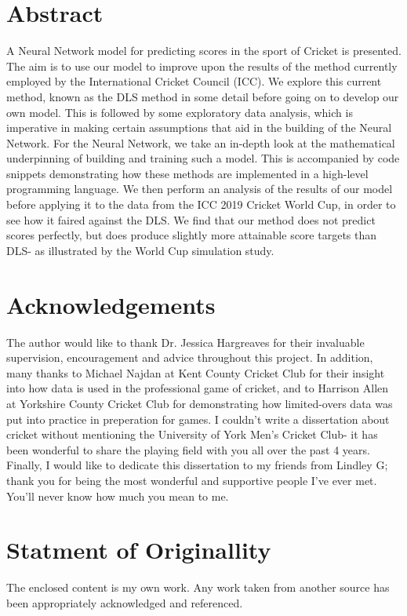 \documentclass[11pt]{report}
\begin{document}


\section*{Abstract}
A Neural Network model for predicting scores in the sport of Cricket is presented. The aim is to use our model to improve upon the results of the method currently employed by 
the International Cricket Council (ICC). We explore this current method, known as the DLS method \cite{stern} in 
some detail before going on to develop our own model. This is followed by some exploratory data analysis, which is imperative in making certain assumptions that aid 
in the building of the Neural Network. For the Neural Network, we take an in-depth look at the mathematical underpinning of building and training such a model. This 
is accompanied by code snippets demonstrating how these methods are implemented in a high-level programming language. We then perform an analysis of the results 
of our model before applying it to the data from the ICC 2019 Cricket World Cup, in order to see how it faired against the DLS. 
We find that our method does not predict scores perfectly, but does produce slightly more attainable score targets than DLS- as illustrated by the World Cup simulation 
study. 

\section*{Acknowledgements}
The author would like to thank Dr. Jessica Hargreaves for their invaluable supervision, encouragement and advice throughout this project. In addition,
many thanks to Michael Najdan at Kent County Cricket Club for their insight into how data is used in the professional game of cricket, and to Harrison Allen at Yorkshire County Cricket Club for demonstrating how limited-overs data was put into practice in preperation for games. 
I couldn't write a dissertation about cricket without mentioning the University of York Men's Cricket Club- it has been wonderful to share the playing field with you all over the past 4 years.
Finally, I would like to dedicate this dissertation to my friends from Lindley G; thank you for being the most wonderful and supportive people I've ever met. You'll never know how much you mean to me.

\section*{Statment of Originallity}
The enclosed content is my own work. Any work taken from another source has been appropriately acknowledged and referenced. 
\end{document}
